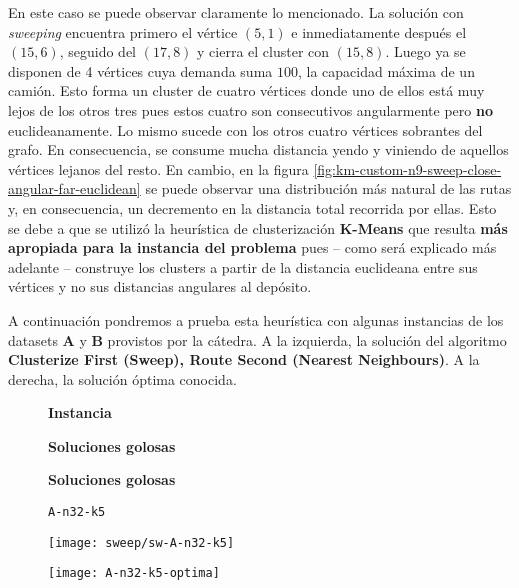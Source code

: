 En este caso se puede observar claramente lo mencionado. La solución con \textit{sweeping} encuentra primero el vértice $(5, 1)$ e inmediatamente después el $(15, 6)$, seguido del $(17, 8)$ y cierra el cluster con $(15, 8)$. Luego ya se disponen de 4 vértices cuya demanda suma $100$, la capacidad máxima de un camión. Esto forma un cluster de cuatro vértices donde uno de ellos está muy lejos de los otros tres pues estos cuatro son consecutivos angularmente pero \textbf{no} euclideanamente. Lo mismo sucede con los otros cuatro vértices sobrantes del grafo. En consecuencia, se consume mucha distancia yendo y viniendo de aquellos vértices lejanos del resto. En cambio, en la figura \ref{fig:km-custom-n9-sweep-close-angular-far-euclidean} se puede observar una distribución más natural de las rutas y, en consecuencia, un decremento en la distancia total recorrida por ellas. Esto se debe a que se utilizó la heurística de clusterización \textbf{K-Means} que resulta \textbf{más apropiada para la instancia del problema} pues – como será explicado más adelante – construye los clusters a partir de la distancia euclideana entre sus vértices y no sus distancias angulares al depósito.

A continuación pondremos a prueba esta heurística con algunas instancias de los datasets \textbf{A} y \textbf{B} provistos por la cátedra. A la izquierda, la solución del algoritmo \textbf{Clusterize First (Sweep), Route Second (Nearest Neighbours)}. A la derecha, la solución óptima conocida.

\begin{figure}[H]
	\begin{minipage}{0.15\textwidth}
		\centering
		\textbf{Instancia}
	\end{minipage}%
	\begin{minipage}{0.40\textwidth}
		\centering
		\textbf{Soluciones golosas}
	\end{minipage}%
	\hspace{0.03\textwidth}
	\begin{minipage}{0.40\textwidth}
		\centering
		\textbf{Soluciones golosas}
	\end{minipage}%
\end{figure}

\begin{figure}[H]
	\begin{minipage}{0.15\textwidth}
		\centering
		\texttt{A-n32-k5}
	\end{minipage}%
	\begin{minipage}{0.40\textwidth}
		\centering
		\texttt{[image: sweep/sw-A-n32-k5]}\par
	\end{minipage}%
	\hspace{0.03\textwidth}
	\begin{minipage}{0.40\textwidth}
		\centering
		\texttt{[image: A-n32-k5-optima]}\par
	\end{minipage}%
\end{figure}


